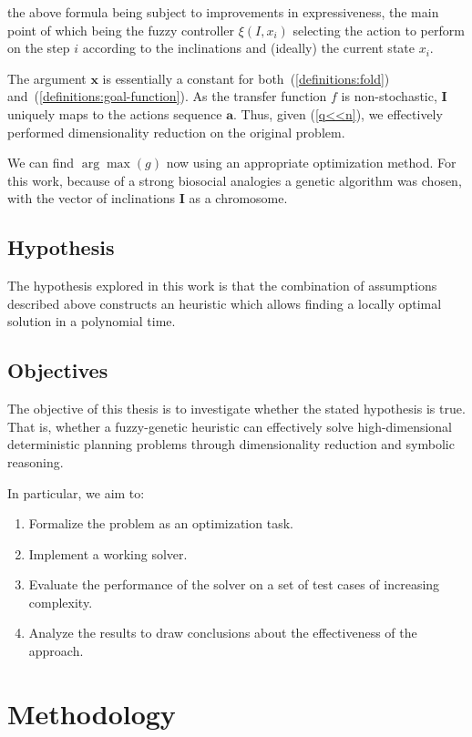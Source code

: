 \documentclass[11pt, a4paper]{article}
\begin{document}
	the above formula being subject to improvements in expressiveness,
	the main point of which being the fuzzy controller $\xi(I, x_i)$ selecting the action to perform on the step $i$ according to the inclinations and (ideally) the current state $x_i$.
	
	The argument $\mathbf{x}$ is essentially a constant for both~(\ref{definitions:fold}) and~(\ref{definitions:goal-function}).
	As the transfer function $f$ is non-stochastic, $\mathbf{I}$ uniquely maps to the actions sequence $\mathbf{a}$.
	Thus, given (\ref{q<<n}), we effectively performed dimensionality reduction on the original problem.
		
	We can find $\arg \max(g)$ now using an appropriate optimization method.
	For this work, because of a strong biosocial analogies a genetic algorithm\cite{mitchell1999geneticalgorithms} was chosen,
	with the vector of inclinations $\mathbf{I}$ as a chromosome.
	
	\subsection{Hypothesis}
	The hypothesis explored in this work is that the combination of assumptions described above constructs an heuristic which allows finding a locally optimal solution in a polynomial time.
	
	\subsection{Objectives}
	The objective of this thesis is to investigate whether the stated hypothesis is true.
	That is, whether a fuzzy-genetic heuristic can effectively solve high-dimensional deterministic planning problems through dimensionality reduction and symbolic reasoning.
	
	In particular, we aim to:
	\begin{enumerate}
		\item Formalize the problem as an optimization task.
		\item Implement a working solver.
		\item Evaluate the performance of the solver on a set of test cases of increasing complexity.
		\item Analyze the results to draw conclusions about the effectiveness of the approach.
	\end{enumerate}

	\section{Methodology}\label{methodology}
\end{document}
